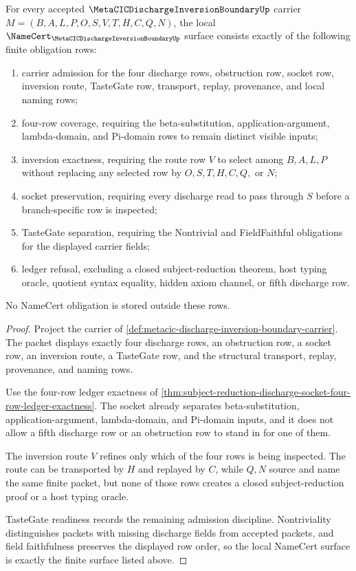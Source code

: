 \begin{theorem}
\label{thm:metacic-discharge-inversion-boundary-namecert-obligations}
For every accepted $\MetaCICDischargeInversionBoundaryUp$ carrier $M=(B,A,L,P,O,S,V,T,H,C,Q,N)$, the local $\NameCert_{\MetaCICDischargeInversionBoundaryUp}$ surface consists exactly of the following finite obligation rows:
\begin{enumerate}
\item carrier admission for the four discharge rows, obstruction row, socket row, inversion route, TasteGate row, transport, replay, provenance, and local naming rows;
\item four-row coverage, requiring the beta-substitution, application-argument, lambda-domain, and Pi-domain rows to remain distinct visible inputs;
\item inversion exactness, requiring the route row $V$ to select among $B,A,L,P$ without replacing any selected row by $O,S,T,H,C,Q,$ or $N$;
\item socket preservation, requiring every discharge read to pass through $S$ before a branch-specific row is inspected;
\item TasteGate separation, requiring the Nontrivial and FieldFaithful obligations for the displayed carrier fields;
\item ledger refusal, excluding a closed subject-reduction theorem, host typing oracle, quotient syntax equality, hidden axiom channel, or fifth discharge row.
\end{enumerate}
No NameCert obligation is stored outside these rows.
\end{theorem}
\begin{proof}
Project the carrier of \autoref{def:metacic-discharge-inversion-boundary-carrier}. The packet displays exactly four discharge rows, an obstruction row, a socket row, an inversion route, a TasteGate row, and the structural transport, replay, provenance, and naming rows.

Use the four-row ledger exactness of \autoref{thm:subject-reduction-discharge-socket-four-row-ledger-exactness}. The socket already separates beta-substitution, application-argument, lambda-domain, and Pi-domain inputs, and it does not allow a fifth discharge row or an obstruction row to stand in for one of them.

The inversion route $V$ refines only which of the four rows is being inspected. The route can be transported by $H$ and replayed by $C$, while $Q,N$ source and name the same finite packet, but none of those rows creates a closed subject-reduction proof or a host typing oracle.

TasteGate readiness records the remaining admission discipline. Nontriviality distinguishes packets with missing discharge fields from accepted packets, and field faithfulness preserves the displayed row order, so the local NameCert surface is exactly the finite surface listed above.
\end{proof}

